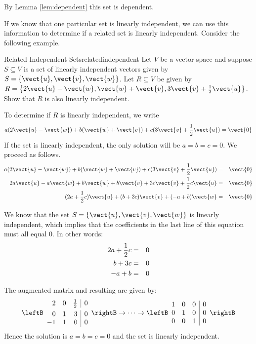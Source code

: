 By Lemma \ref{lem:dependent} this set is dependent. 

If we know that one particular set is linearly independent, we can use this information to determine if a related set is linearly independent. Consider the following example.

\begin{example}{Related Independent Sets}{relatedindependent}
Let $V$ be a vector space and suppose $S \subseteq V$ is a set of linearly independent vectors given by $S = \left\{ \vect{u}, \vect{v}, \vect{w} \right\}$. Let $R \subseteq V$ be given by $R = \left\{ 2\vect{u} - \vect{w}, \vect{w} + \vect{v}, 3\vect{v} + \frac{1}{2} \vect{u} \right\}$. Show that $R$ is also linearly independent. 
\end{example}

\begin{solution}
To determine if $R$ is linearly independent, we write 
\[
a(2\vect{u} - \vect{w}) + b(\vect{w} + \vect{v}) + c( 3\vect{v} + \vspace{0.05in}\frac{1}{2}\vect{u}) = \vect{0} \]
If the set is linearly independent, the only solution will be $a=b=c=0$. We proceed as follows.  
\begin{eqnarray*}
a(2\vect{u} - \vect{w}) + b(\vect{w} + \vect{v}) + c( 3\vect{v} + \vspace{0.05in}\frac{1}{2} \vect{u}) &=& \vect{0} \\
2a\vect{u} - a\vect{w} + b\vect{w} + b\vect{v}  + 3c\vect{v} + \vspace{0.05in}\frac{1}{2}c\vect{u} &=& \vect{0}\\
(2a + \vspace{0.05in}\frac{1}{2}c) \vect{u} + (b+3c)\vect{v} + (-a + b) \vect{w} &=& \vect{0}
\end{eqnarray*}

We know that the set $S = \left\{ \vect{u}, \vect{v}, \vect{w} \right\}$ is linearly independent, which implies that the coefficients in the last line of this equation must all equal $0$. 
In other words:
\begin{eqnarray*}
2a + \vspace{0.05in}\frac{1}{2} c &=& 0 \\
b + 3c &=& 0 \\
-a + b &=& 0 
\end{eqnarray*}

The augmented matrix and resulting {\rref} are given by:
\[
\leftB \begin{array}{rrr|r}
2 & 0 & \vspace{0.05in}\frac{1}{2} & 0 \\
0 & 1 & 3 & 0 \\
-1 & 1 & 0 & 0 
\end{array}\rightB
\rightarrow \cdots \rightarrow
\leftB \begin{array}{rrr|r}
1 & 0 & 0 & 0 \\
0 & 1 & 0 & 0 \\
0 & 0 & 1 & 0 
\end{array}\rightB
\]
Hence the solution is $a=b=c=0$ and the set is linearly independent. 
\end{solution}

